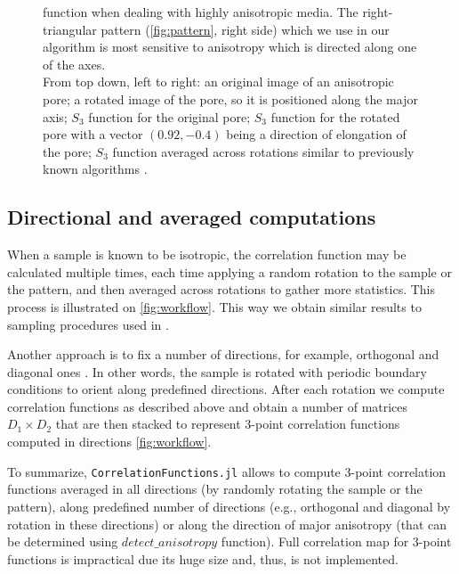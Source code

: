 \documentclass[reprint,amsmath,amssymb,aps,pre,showkeys,showpacs]{revtex4-1}
\newcommand{\code}[1]{\colorbox{light-gray}{\texttt{#1}}}
\begin{document}
\begin{figure}[ht]
{    function when dealing with highly anisotropic media. The right-triangular
    pattern (\cref{fig:pattern}, right side) which we use in our algorithm is
    most sensitive to anisotropy which is directed along one of the
    axes. \\ From top down, left to right: an original image of an anisotropic
    pore; a rotated image of the pore, so it is positioned along the major axis;
    $S_3$ function for the original pore; $S_3$ function for the rotated pore
    with a vector $(0.92, -0.4)$ being a direction of elongation of the pore;
    $S_3$ function averaged across rotations similar to previously known
    algorithms \cite{berryman1988,SMITH1988176,malmir2018}.}
  \label{fig:aniso}
\end{figure}

\subsection{Directional and averaged computations}
When a sample is known to be isotropic, the correlation function may be
calculated multiple times, each time applying a random rotation to the sample or
the pattern, and then averaged across rotations to gather more statistics. This
process is illustrated on \cref{fig:workflow}. This way we obtain similar
results to sampling procedures used in
\cite{berryman1988,SMITH1988176,malmir2018}.

Another approach is to fix a number of directions, for example, orthogonal and
diagonal ones \cite{EPL1,EPL2,CFsjlpaper}. In other words, the sample is rotated
with periodic boundary conditions to orient along predefined directions. After
each rotation we compute correlation functions as described above and obtain a
number of matrices $D_1 \times D_2$ that are then stacked to represent 3-point
correlation functions computed in directions \cref{fig:workflow}.

To summarize, \code{CorrelationFunctions.jl} allows to compute 3-point
correlation functions averaged in all directions (by randomly rotating the
sample or the pattern), along predefined number of directions (e.g., orthogonal
and diagonal by rotation in these directions) or along the direction of major
anisotropy (that can be determined using \code{$detect\_anisotropy$} function).
Full correlation map for 3-point functions is impractical due its huge size and,
thus, is not implemented.
\end{document}
